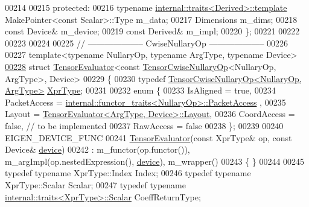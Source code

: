 \begin{DoxyCode}
00214 
00215  \textcolor{keyword}{protected}:
00216   \textcolor{keyword}{typename} \hyperlink{struct_eigen_1_1internal_1_1traits}{internal::traits<Derived>::template} MakePointer<const
       Scalar>::Type m\_data;
00217   Dimensions m\_dims;
00218   \textcolor{keyword}{const} Device& m\_device;
00219   \textcolor{keyword}{const} Derived& m\_impl;
00220 \};
00221 
00222 
00223 
00224 
00225 \textcolor{comment}{// -------------------- CwiseNullaryOp --------------------}
00226 
00227 \textcolor{keyword}{template}<\textcolor{keyword}{typename} NullaryOp, \textcolor{keyword}{typename} ArgType, \textcolor{keyword}{typename} Device>
\hyperlink{struct_eigen_1_1_tensor_evaluator_3_01const_01_tensor_cwise_nullary_op_3_01_nullary_op_00_01_arg_type_01_4_00_01_device_01_4}{00228} \textcolor{keyword}{struct }\hyperlink{struct_eigen_1_1_tensor_evaluator}{TensorEvaluator}<const \hyperlink{class_eigen_1_1_tensor_cwise_nullary_op}{TensorCwiseNullaryOp}<NullaryOp, ArgType>, 
      Device>
00229 \{
00230   \textcolor{keyword}{typedef} \hyperlink{class_eigen_1_1_tensor_cwise_nullary_op}{TensorCwiseNullaryOp<NullaryOp, ArgType>} 
      \hyperlink{class_eigen_1_1_tensor_cwise_nullary_op}{XprType};
00231 
00232   \textcolor{keyword}{enum} \{
00233     IsAligned = \textcolor{keyword}{true},
00234     PacketAccess = \hyperlink{struct_eigen_1_1internal_1_1functor__traits}{internal::functor\_traits<NullaryOp>::PacketAccess}
      ,
00235     Layout = \hyperlink{struct_eigen_1_1_tensor_evaluator}{TensorEvaluator<ArgType, Device>::Layout},
00236     CoordAccess = \textcolor{keyword}{false},  \textcolor{comment}{// to be implemented}
00237     RawAccess = \textcolor{keyword}{false}
00238   \};
00239 
00240   EIGEN\_DEVICE\_FUNC
00241   \hyperlink{struct_eigen_1_1_tensor_evaluator}{TensorEvaluator}(\textcolor{keyword}{const} XprType& op, \textcolor{keyword}{const} Device& \hyperlink{struct_eigen_1_1_tensor_evaluator_a98b51809ed8f7a1f736eb7b952b9636e}{device})
00242       : m\_functor(op.functor()), m\_argImpl(op.nestedExpression(), \hyperlink{struct_eigen_1_1_tensor_evaluator_a98b51809ed8f7a1f736eb7b952b9636e}{device}), m\_wrapper()
00243   \{ \}
00244 
00245   \textcolor{keyword}{typedef} \textcolor{keyword}{typename} XprType::Index Index;
00246   \textcolor{keyword}{typedef} \textcolor{keyword}{typename} XprType::Scalar Scalar;
00247   \textcolor{keyword}{typedef} \textcolor{keyword}{typename} \hyperlink{struct_eigen_1_1internal_1_1traits}{internal::traits<XprType>::Scalar} CoeffReturnType;

\end{DoxyCode}
